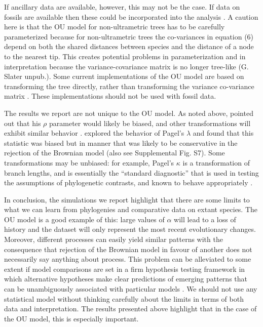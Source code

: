 \documentclass[a4paper,12pt]{article}
\begin{document}
If ancillary data are available, however, this may not be the case. If data on fossils are available then these could be incorporated into the analysis \citep{Slater:2012ab}.  A caution here is that the OU model for non-ultrametric trees has to be carefully parameterized because for non-ultrametric trees the co-variances in equation (6) depend on both the shared distances between species and the distance of a node to the nearest tip. This creates potential problems in parameterization and in interpretation because the variance-covariance matrix is no longer tree-like (G. Slater unpub.). Some current implementations of the OU model are based on transforming the tree directly, rather than transforming the variance co-variance matrix \citep[e.g., MOTMOT;][]{Thomas:2011aa}. These implementations should not be used with fossil data.

The results we report are not unique to the OU model. As noted above, \citet{grafen1989phylogenetic} pointed out that his $\rho$ parameter would likely be biased, and other transformations \citep[e.g., $\lambda$, $\delta$, ACDC;][]{Pagel:1997aa,Pagel:1999aa,Blomberg:2003aa} will exhibit similar behavior \citep[e.g., see][]{freckleton2002phylogenetic}. \citet{freckleton2002phylogenetic} explored the behavior of Pagel’s $\lambda$ and found that this statistic was biased but in manner that was likely to be conservative in the rejection of the Brownian model (also see Supplemental Fig. S7). Some transformations may be unbiased: for example, Pagel’s $\kappa$ is a transformation of branch lengths, and is essentially the “standard diagnostic” that is used in testing the assumptions of phylogenetic contrasts, and known to behave appropriately \citep[Supplemental Fig. S6;][]{garland1992procedures}.
  
In conclusion, the simulations we report highlight that there are some limits to what we can learn from phylogenies and comparative data on extant species. The OU model is a good example of this: large values of $\alpha$ will lead to a loss of history and the dataset will only represent the most recent evolutionary changes. Moreover, different processes can easily yield similar patterns \citep[e.g.,][]{Revell:2008ab} with the consequence that rejection of the Brownian model in favour of another does not necessarily say anything about process. This problem can be alleviated to some extent if model comparisons are set in a firm hypothesis testing framework in which alternative hypotheses make clear predictions of emerging patterns that can be unambiguously associated with particular models \citep[e.g.,][]{Cooper:2011aa}. We should not use any statistical model without thinking carefully about the limits in terms of both data and interpretation. The results presented above highlight that in the case of the OU model, this is especially important. 
\end{document}
